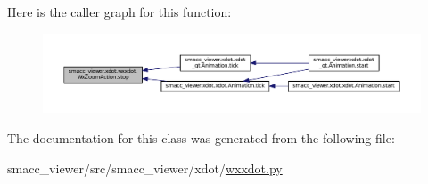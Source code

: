 Here is the caller graph for this function\+:
\nopagebreak
\begin{figure}[H]
\begin{center}
\leavevmode
\includegraphics[width=350pt]{classsmacc__viewer_1_1xdot_1_1wxxdot_1_1WxZoomAction_a596dc21f5accb8a8c065b97855501026_icgraph}
\end{center}
\end{figure}




The documentation for this class was generated from the following file\+:\begin{DoxyCompactItemize}
\item 
smacc\+\_\+viewer/src/smacc\+\_\+viewer/xdot/\hyperlink{wxxdot_8py}{wxxdot.\+py}\end{DoxyCompactItemize}
